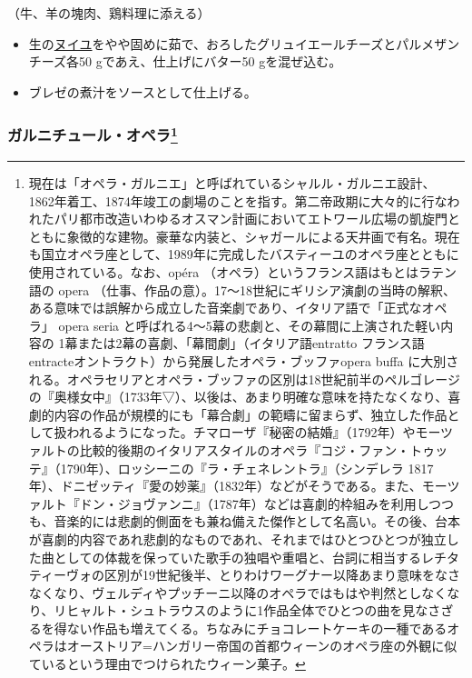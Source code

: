 \begin{recette}
（牛、羊の塊肉、鶏料理に添える）

\begin{itemize}
\item
  生の\protect\hyperlink{nouilles}{ヌイユ}をやや固めに茹で、おろしたグリュイエールチーズとパルメザンチーズ各50
  gであえ、仕上げにバター50 gを混ぜ込む。
\item
  ブレゼの煮汁をソースとして仕上げる。
\end{itemize}

\hypertarget{garniture-opera}{%
\subsubsection[ガルニチュール・オペラ]{\texorpdfstring{ガルニチュール・オペラ\footnote{現在は「オペラ・ガルニエ」と呼ばれているシャルル・ガルニエ設計、
  1862年着工、1874年竣工の劇場のことを指す。第二帝政期に大々的に行なわれたパリ都市改造いわゆるオスマン計画においてエトワール広場の凱旋門とともに象徴的な建物。豪華な内装と、シャガールによる天井画で有名。現在も国立オペラ座として、1989年に完成したバスティーユのオペラ座とともに使用されている。なお、opéra
  （オペラ）というフランス語はもとはラテン語の opera
  （仕事、作品の意）。17〜18世紀にギリシア演劇の当時の解釈、ある意味では誤解から成立した音楽劇であり、イタリア語で「正式なオペラ」
  opera seria と呼ばれる4〜5幕の悲劇と、その幕間に上演された軽い内容の
  1幕または2幕の喜劇、「幕間劇」（イタリア語entratto フランス語
  entracteオントラクト）から発展したオペラ・ブッファopera buffa
  に大別される。オペラセリアとオペラ・ブッファの区別は18世紀前半のペルゴレージの『奥様女中』（1733年▽）、以後は、あまり明確な意味を持たなくなり、喜劇的内容の作品が規模的にも「幕合劇」の範疇に留まらず、独立した作品として扱われるようになった。チマローザ『秘密の結婚』（1792年）やモーツァルトの比較的後期のイタリアスタイルのオペラ『コジ・ファン・トゥッテ』（1790年）、ロッシーニの『ラ・チェネレントラ』（シンデレラ
  1817年）、ドニゼッティ『愛の妙薬』（1832年）などがそうである。また、モーツァルト『ドン・ジョヴァンニ』（1787年）などは喜劇的枠組みを利用しつつも、音楽的には悲劇的側面をも兼ね備えた傑作として名高い。その後、台本が喜劇的内容であれ悲劇的なものであれ、それまではひとつひとつが独立した曲としての体裁を保っていた歌手の独唱や重唱と、台詞に相当するレチタティーヴォの区別が19世紀後半、とりわけワーグナー以降あまり意味をなさなくなり、ヴェルディやプッチーニ以降のオペラではもはや判然としなくなり、リヒャルト・シュトラウスのように1作品全体でひとつの曲を見なさざるを得ない作品も増えてくる。ちなみにチョコレートケーキの一種であるオペラはオーストリア=ハンガリー帝国の首都ウィーンのオペラ座の外観に似ているという理由でつけられたウィーン菓子。}}{ガルニチュール・オペラ}}\label{garniture-opera}}


\end{recette}
